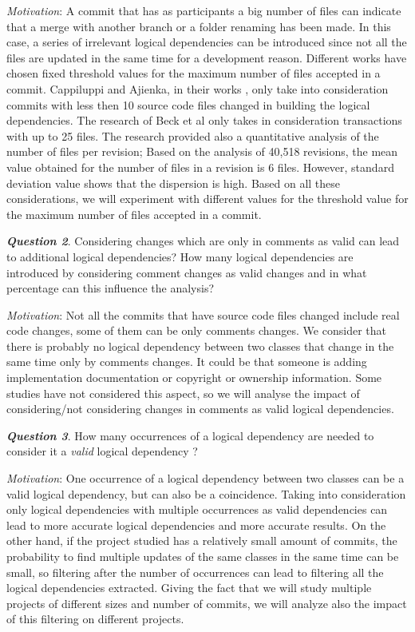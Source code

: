 \documentclass[conference]{IEEEtran}
\begin{document}
\textit{Motivation}: A commit that has as participants a big number of files can indicate that a merge with another branch or a folder renaming has been made. In this case, a series of irrelevant logical dependencies can be introduced since not all the files are updated in the same time for a development reason. Different works have chosen fixed threshold values for the maximum number of files accepted in a commit. Cappiluppi and Ajienka, in their works \cite{DBLP:journals/jss/AjienkaC17}, \cite{DBLP:journals/ese/AjienkaCC18} only take into consideration commits with less then 10 source code files changed in building the logical dependencies. The research of Beck et al \cite{Beck:2011:CMC:2025113.2025162} only takes in consideration transactions with up to 25 files. The research \cite{Oliva:2011:ISL:2067853.2068086} provided also a quantitative analysis of the number of files per revision; Based on the analysis of  40,518 revisions, the mean value obtained for the number of files in a revision is 6 files. However, standard deviation value shows that the dispersion is high. Based on all these considerations, we will experiment with different values for the threshold value for the maximum number of files accepted in a commit. 



\textit{\textbf{Question 2}}. Considering changes which are only in comments as valid can lead to additional logical dependencies? How many logical dependencies are introduced by considering comment changes as valid changes and in what percentage can this influence the analysis?

\textit{Motivation}: Not all the commits that have source code files changed include real code changes, some of them can be only comments changes. We consider that there is probably no logical dependency between two classes that change in the same time only by comments changes. It could be that someone is adding implementation documentation or copyright or ownership information. Some studies have not considered this aspect, so we will analyse the impact of considering/not considering changes in  comments as valid logical dependencies. 


\textit{\textbf{Question 3}}. How many occurrences of a logical dependency are needed to consider it a \textit{valid} logical dependency ? 

\textit{Motivation}: One occurrence of a logical dependency between two classes can be a valid logical dependency, but can also be a coincidence. Taking into consideration only logical dependencies with multiple occurrences as valid dependencies can lead to more accurate logical dependencies and more accurate results. On the other hand, if the project studied has a relatively small amount of commits, the probability to find multiple updates of the same classes in the same time can be small, so filtering after the number of occurrences can lead to filtering all the logical dependencies extracted. Giving the fact that we will study multiple projects of different sizes and number of commits, we will analyze also the impact of this filtering on different projects.
\end{document}
